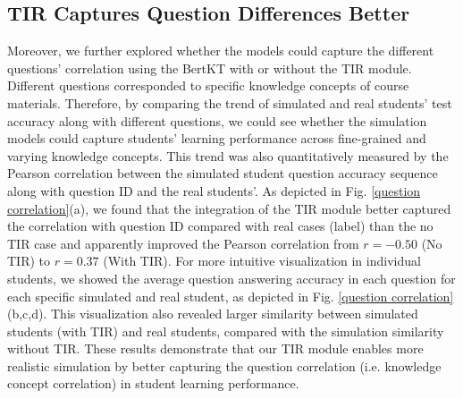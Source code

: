 \subsection{TIR Captures Question Differences Better}
Moreover, we further explored whether the models could capture the different questions' correlation using the BertKT with or without the TIR module. Different questions corresponded to specific knowledge concepts of course materials. Therefore, by comparing the trend of simulated and real students' test accuracy along with different questions, we could see whether the simulation models could capture students' learning performance across fine-grained and varying knowledge concepts. 
This trend was also quantitatively measured by the Pearson correlation between the simulated student question accuracy sequence along with question ID and the real students'.    
As depicted in Fig. \ref{question correlation}(a), we found that the integration of the TIR module better captured the correlation with question ID compared with real cases (label) than the no TIR case and apparently improved the Pearson correlation from $r=-0.50$ (No TIR) to $r=0.37$ (With TIR).
For more intuitive visualization in individual students, we showed the average question answering accuracy in each question for each specific simulated and real student, as depicted in Fig. \ref{question correlation}(b,c,d). This visualization also revealed larger similarity between simulated students (with TIR) and real students, compared with the simulation similarity without TIR.
These results demonstrate that our TIR module enables more realistic simulation by better capturing the question correlation (i.e. knowledge concept correlation) in student learning performance.


